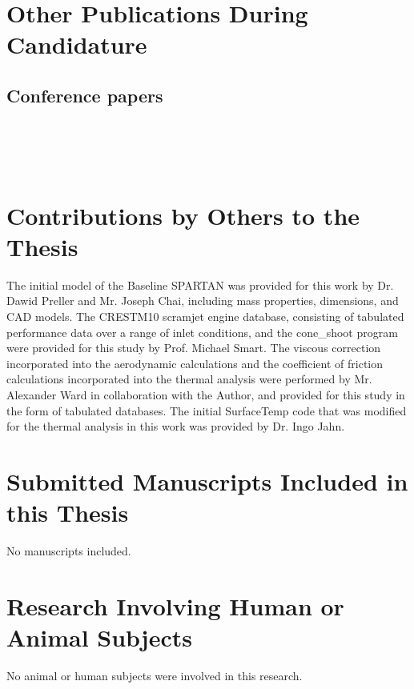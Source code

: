\section*{Other Publications During Candidature}

\subsection*{Conference papers}

\noindent{}\\

\noindent{}\\

\noindent{}\\

\section*{Contributions by Others to the Thesis}

The initial model of the Baseline SPARTAN was provided for this work by Dr. Dawid Preller and Mr. Joseph Chai, including mass properties, dimensions, and CAD models. The \textsf{CRESTM10} scramjet engine database, consisting of tabulated performance data over a range of inlet conditions, and the \textsf{cone\_shoot} program were provided for this study by Prof. Michael Smart. The viscous correction incorporated into the aerodynamic calculations and the coefficient of friction calculations incorporated into the thermal analysis were performed by Mr. Alexander Ward in collaboration with the Author, and provided for this study in the form of tabulated databases. The initial \textsf{SurfaceTemp} code that was modified for the thermal analysis in this work was provided by Dr. Ingo Jahn. 



\section*{Submitted Manuscripts Included in this Thesis}
No manuscripts included.

\section*{Research Involving Human or Animal Subjects}
No animal or human subjects were involved in this research.


